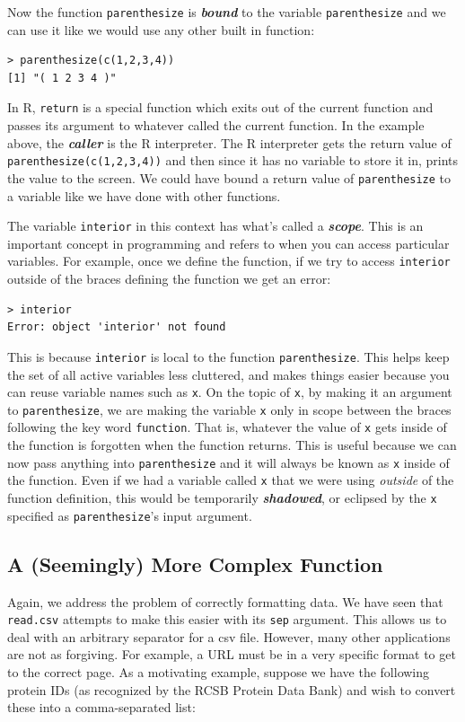 \documentclass[12pt]{article}
\theoremstyle{remark}
\newcommand{\vocab}[1]{\textbf{\emph{#1}}}
\begin{document}
Now the function \verb|parenthesize| is \vocab{bound} to the variable \verb|parenthesize| and we can use it like we would use any other built in function:
\begin{verbatim}
> parenthesize(c(1,2,3,4))
[1] "( 1 2 3 4 )"
\end{verbatim}

In R, \verb|return| is a special function which exits out of the current function and passes its argument to whatever called the current function. In the example above, the \vocab{caller} is the R interpreter. The R interpreter gets the return value of \verb|parenthesize(c(1,2,3,4))| and then since it has no variable to store it in, prints the value to the screen. We could have bound a return value of \verb|parenthesize| to a variable like we have done with other functions.

The variable \verb|interior| in this context has what's called a \vocab{scope}. This is an important concept in programming and refers to when you can access particular variables. For example, once we define the function, if we try to access \verb|interior| outside of the braces defining the function we get an error:
\begin{verbatim}
> interior
Error: object 'interior' not found
\end{verbatim}
This is because \verb|interior| is local to the function \verb|parenthesize|. This helps keep the set of all active variables less cluttered, and makes things easier because you can reuse variable names such as \verb|x|. On the topic of \verb|x|, by making it an argument to \verb|parenthesize|, we are making the variable \verb|x| only in scope between the braces following the key word \verb|function|. That is, whatever the value of \verb|x| gets inside of the function is forgotten when the function returns. This is useful because we can now pass anything into \verb|parenthesize| and it will always be known as \verb|x| inside of the function. Even if we had a variable called \verb|x| that we were using \emph{outside} of the function definition, this would be temporarily \vocab{shadowed}, or eclipsed by the \verb|x| specified as \verb|parenthesize|'s input argument.


\subsection{A (Seemingly) More Complex Function}
Again, we address the problem of correctly formatting data. We have seen that \verb|read.csv| attempts to make this easier with its \verb|sep| argument. This allows us to deal with an arbitrary separator for a csv file. However, many other applications are not as forgiving. For example, a URL must be in a very specific format to get to the correct page. As a motivating example, suppose we have the following protein IDs (as recognized by the RCSB Protein Data Bank) and wish to convert these into a comma-separated list:
\end{document}
